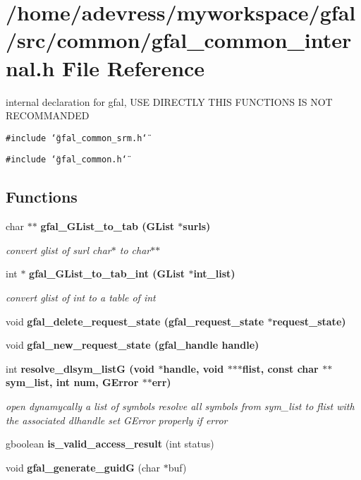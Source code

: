 \section{/home/adevress/myworkspace/gfal/src/common/gfal\_\-common\_\-internal.h File Reference}
\label{gfal__common__internal_8h}
internal declaration for gfal, USE DIRECTLY THIS FUNCTIONS IS NOT RECOMMANDED 

{\tt \#include \char`\"{}gfal\_\-common\_\-srm.h\char`\"{}}\par
{\tt \#include \char`\"{}gfal\_\-common.h\char`\"{}}\par
\subsection*{Functions}
\begin{CompactItemize}
\item 
char $\ast$$\ast$ \bf{gfal\_\-GList\_\-to\_\-tab} (GList $\ast$surls)
\begin{CompactList}\small\item\em convert glist of surl char$\ast$ to char$\ast$$\ast$ \item\end{CompactList}\item 
int $\ast$ \bf{gfal\_\-GList\_\-to\_\-tab\_\-int} (GList $\ast$int\_\-list)
\begin{CompactList}\small\item\em convert glist of int to a table of int \item\end{CompactList}\item 
void \bf{gfal\_\-delete\_\-request\_\-state} (\bf{gfal\_\-request\_\-state} $\ast$request\_\-state)
\item 
void \bf{gfal\_\-new\_\-request\_\-state} (gfal\_\-handle handle)
\item 
int \bf{resolve\_\-dlsym\_\-list\-G} (void $\ast$handle, void $\ast$$\ast$$\ast$flist, const char $\ast$$\ast$sym\_\-list, int num, GError $\ast$$\ast$err)\label{gfal__common__internal_8h_0323a4ab58106e316851c1ae06148e28}

\begin{CompactList}\small\item\em open dynamycally a list of symbols resolve all symbols from sym\_\-list to flist with the associated dlhandle set GError properly if error \item\end{CompactList}\item 
gboolean \textbf{is\_\-valid\_\-access\_\-result} (int status)\label{gfal__common__internal_8h_aed64917ebc1c60ab8ccd2c4dfbd2c3a}

\item 
void \textbf{gfal\_\-generate\_\-guid\-G} (char $\ast$buf)\label{gfal__common__internal_8h_ba7af0c28514f5d12152018b81478505}

\end{CompactItemize}


